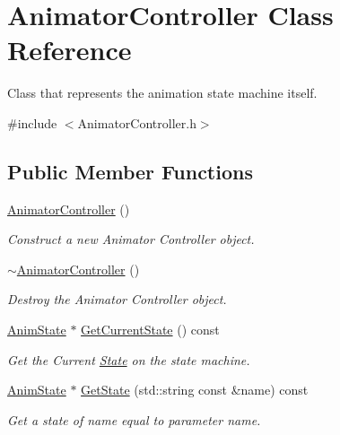 \hypertarget{classAnimatorController}{}\section{Animator\+Controller Class Reference}
\label{classAnimatorController}


Class that represents the animation state machine itself.  




{\ttfamily \#include $<$Animator\+Controller.\+h$>$}

\subsection*{Public Member Functions}
\begin{DoxyCompactItemize}
\item 
\hyperlink{classAnimatorController_a9b32e8e7a4b72e80c6ae7a88fc961c4e}{Animator\+Controller} ()
\begin{DoxyCompactList}\small\item\em Construct a new Animator Controller object. \end{DoxyCompactList}\item 
\mbox{\label{classAnimatorController_a9f96c39d24c29d96c6d343737411c0bd}} 
\hyperlink{classAnimatorController_a9f96c39d24c29d96c6d343737411c0bd}{$\sim$\+Animator\+Controller} ()
\begin{DoxyCompactList}\small\item\em Destroy the Animator Controller object. \end{DoxyCompactList}\item 
\hyperlink{structAnimState}{Anim\+State} $\ast$ \hyperlink{classAnimatorController_ae84a0064dd344fb2a2b4bb6de69557e1}{Get\+Current\+State} () const
\begin{DoxyCompactList}\small\item\em Get the Current \hyperlink{classState}{State} on the state machine. \end{DoxyCompactList}\item 
\hyperlink{structAnimState}{Anim\+State} $\ast$ \hyperlink{classAnimatorController_aa2b6d02748cb880d596122448f685f9f}{Get\+State} (std\+::string const \&name) const
\begin{DoxyCompactList}\small\item\em Get a state of name equal to parameter name. \end{DoxyCompactList}\item 

\end{DoxyCompactItemize}
